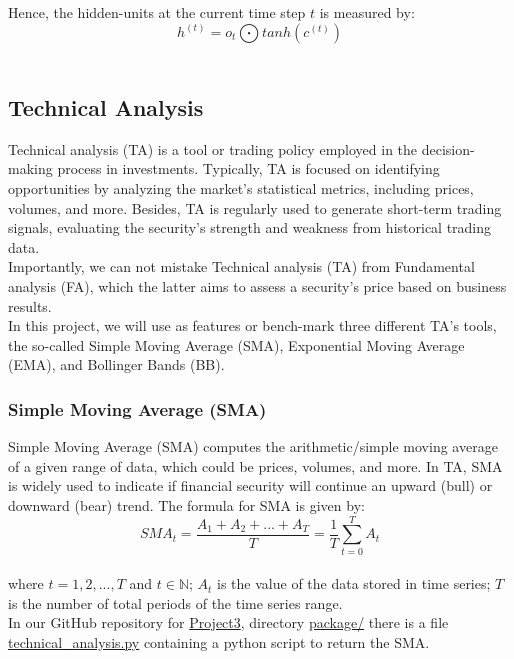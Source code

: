 Hence, the hidden-units at the current time step $t$ is measured by:\\

$$h^{(t)} = o_t \bigodot tanh(c^{(t)})$$\\

\subsection{Technical Analysis}
\label{chap:Technical Analysis}

\quad Technical analysis (TA) is a tool or trading policy employed in the decision-making process in investments. Typically, TA is focused on identifying opportunities by analyzing the market's statistical metrics, including prices, volumes, and more. Besides, TA is regularly used to generate short-term trading signals, evaluating the security's strength and weakness from historical trading data.\\

Importantly, we can not mistake Technical analysis (TA) from Fundamental analysis (FA), which the latter aims to assess a security's price based on business results.\\

In this project, we will use as features or bench-mark three different TA's tools, the so-called Simple Moving Average (SMA), Exponential Moving Average (EMA), and Bollinger Bands (BB).

\subsubsection{Simple Moving Average (SMA)}
\label{chap:Simple Moving Average (SMA)}

\quad Simple Moving Average (SMA) computes the arithmetic/simple moving average of a given range of data, which could be prices, volumes, and more. In TA, SMA is widely used to indicate if financial security will continue an upward (bull) or downward (bear) trend. The formula for SMA is given by:\\

$${SMA}_t = \frac{A_1 + A_2 + ... + A_T}{T} = \frac{1}{T} \sum_{t=0}^{T} A_t$$\\

\noindent where $t = 1, 2, ..., T$ and $t \in \mathbb{N}$; $A_t$ is the value of the data stored in time series; $T$ is the number of total periods of the time series range.\\

In our GitHub repository for \href{https://github.com/fabiorodp/UiO-FYS-STK4155/tree/master/Project3}{Project3}, directory \href{https://github.com/fabiorodp/UiO-FYS-STK4155/tree/master/Project3/package/}{package/} there is a file \href{https://github.com/fabiorodp/UiO-FYS-STK4155/tree/master/Project3/package/technical_analysis.py}{technical\_analysis.py} containing a python script to return the SMA.

